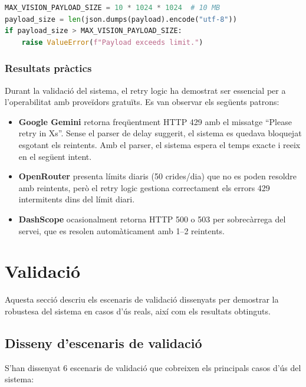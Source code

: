 \documentclass[12pt,a4paper,twoside]{report}
\begin{document}
\begin{lstlisting}[language=Python]
MAX_VISION_PAYLOAD_SIZE = 10 * 1024 * 1024  # 10 MB
payload_size = len(json.dumps(payload).encode("utf-8"))
if payload_size > MAX_VISION_PAYLOAD_SIZE:
    raise ValueError(f"Payload exceeds limit.")
\end{lstlisting}

\subsection{Resultats pr\`actics}

Durant la validaci\'o del sistema, el retry logic ha demostrat ser essencial per a l'operabilitat amb prove\"idors gratu\"its. Es van observar els seg\"uents patrons:

\begin{itemize}
    \item \textbf{Google Gemini} retorna freq\"uentment HTTP 429 amb el missatge ``Please retry in Xs''. Sense el parser de delay suggerit, el sistema es quedava bloquejat esgotant els reintents. Amb el parser, el sistema espera el temps exacte i reeix en el seg\"uent intent.
    \item \textbf{OpenRouter} presenta l\'imits diaris (50 crides/dia) que no es poden resoldre amb reintents, per\`o el retry logic gestiona correctament els errors 429 intermitents dins del l\'imit diari.
    \item \textbf{DashScope} ocasionalment retorna HTTP 500 o 503 per sobrec\`arrega del servei, que es resolen autom\`aticament amb 1--2 reintents.
\end{itemize}

\chapter{Validaci\'o}
\label{chap:validacio}

Aquesta secci\'o descriu els escenaris de validaci\'o dissenyats per demostrar la robustesa del sistema en casos d'\'us reals, aix\'i com els resultats obtinguts.

\section{Disseny d'escenaris de validaci\'o}
\label{sec:escenaris}

S'han dissenyat 6 escenaris de validaci\'o que cobreixen els principals casos d'\'us del sistema:
\end{document}
